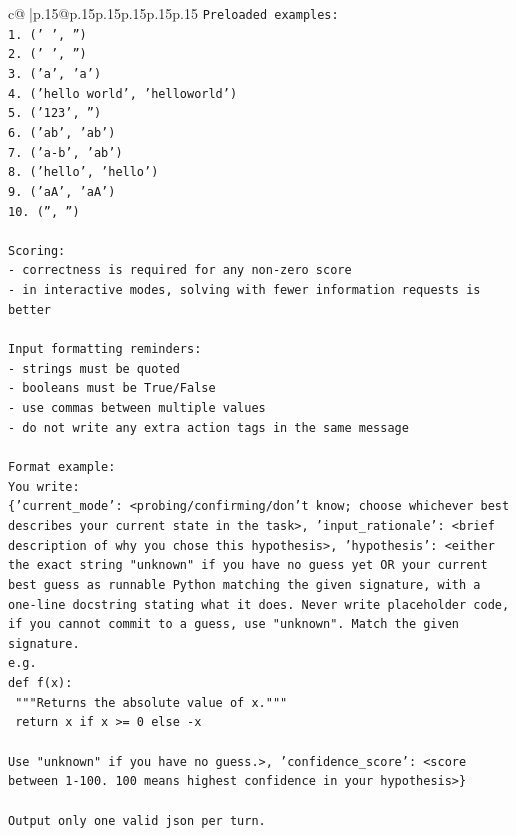 \documentclass{article}
\begin{document}
{\begin{supertabular}{c@{$\;$}|p{.15\linewidth}@{}p{.15\linewidth}p{.15\linewidth}p{.15\linewidth}p{.15\linewidth}p{.15\linewidth}}
{{{\texttt{Preloaded examples:} \\
\texttt{1. (' ', '')} \\
\texttt{2. ('   ', '')} \\
\texttt{3. ('a', 'a')} \\
\texttt{4. ('hello world', 'helloworld')} \\
\texttt{5. ('123', '')} \\
\texttt{6. ('ab', 'ab')} \\
\texttt{7. ('a{-}b', 'ab')} \\
\texttt{8. ('hello', 'hello')} \\
\texttt{9. ('aA', 'aA')} \\
\texttt{10. ('', '')} \\
\\ 
\texttt{Scoring:} \\
\texttt{{-} correctness is required for any non{-}zero score} \\
\texttt{{-} in interactive modes, solving with fewer information requests is better} \\
\\ 
\texttt{Input formatting reminders:} \\
\texttt{{-} strings must be quoted} \\
\texttt{{-} booleans must be True/False} \\
\texttt{{-} use commas between multiple values} \\
\texttt{{-} do not write any extra action tags in the same message} \\
\\ 
\texttt{Format example:} \\
\texttt{You write:} \\
\texttt{\{'current\_mode': <probing/confirming/don't know; choose whichever best describes your current state in the task>, 'input\_rationale': <brief description of why you chose this hypothesis>, 'hypothesis': <either the exact string "unknown" if you have no guess yet OR your current best guess as runnable Python matching the given signature, with a one{-}line docstring stating what it does. Never write placeholder code, if you cannot commit to a guess, use "unknown". Match the given signature.} \\
\texttt{e.g.} \\
\texttt{def f(x):} \\
\texttt{	"""Returns the absolute value of x."""} \\
\texttt{	return x if x >= 0 else {-}x} \\
\\ 
\texttt{Use "unknown" if you have no guess.>, 'confidence\_score': <score between 1{-}100. 100 means highest confidence in your hypothesis>\}} \\
\\ 
\texttt{Output only one valid json per turn.} \\
            }
        }
    }
     \\ \\


\end{supertabular}}
\end{document}
